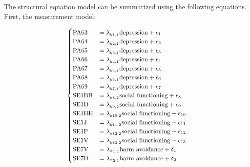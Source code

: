 \documentclass[11pt]{article}
\begin{document}

The structural equation model can be summarized using the following equations.
First, the measurement model:

\begin{equation}
  \small
  \label{eq:measurement_model}
  \begin{cases}
    \textrm{PA63}  & = \lambda_{y_{1,1}}  \textrm{depression}         + \epsilon_1  \\
    \textrm{PA64}  & = \lambda_{y_{2,1}}  \textrm{depression}         + \epsilon_2  \\
    \textrm{PA65}  & = \lambda_{y_{3,1}}  \textrm{depression}         + \epsilon_3  \\
    \textrm{PA66}  & = \lambda_{y_{4,1}}  \textrm{depression}         + \epsilon_4  \\
    \textrm{PA67}  & = \lambda_{y_{5,1}}  \textrm{depression}         + \epsilon_5  \\
    \textrm{PA68}  & = \lambda_{y_{6,1}}  \textrm{depression}         + \epsilon_6  \\
    \textrm{PA69}  & = \lambda_{y_{7,1}}  \textrm{depression}         + \epsilon_7  \\
    \textrm{SE1BB} & = \lambda_{y_{8,2}}  \textrm{social functioning} + \epsilon_8  \\
    \textrm{SE1D}  & = \lambda_{y_{9,2}}  \textrm{social functioning} + \epsilon_9  \\
    \textrm{SE1HH} & = \lambda_{y_{10,2}} \textrm{social functioning} + \epsilon_{10} \\
    \textrm{SE1J}  & = \lambda_{y_{11,2}} \textrm{social functioning} + \epsilon_{11} \\
    \textrm{SE1P}  & = \lambda_{y_{12,2}} \textrm{social functioning} + \epsilon_{12} \\
    \textrm{SE1V}  & = \lambda_{y_{13,2}} \textrm{social functioning} + \epsilon_{13} \\
    \textrm{SE7V}  & = \lambda_{x_{1,1}} \textrm{harm avoidance}     + \delta_1 \\
    \textrm{SE7D}  & = \lambda_{x_{2,1}} \textrm{harm avoidance}     + \delta_2 \\

\end{cases}
\end{equation}
\end{document}
